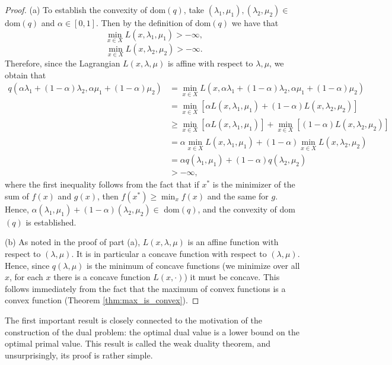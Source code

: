 \documentclass[10pt,a4paper]{article}
\begin{document}
\begin{proof}
	
(a) To establish the convexity of dom$(q)$, take $(\lambda_1, \mu_1), (\lambda_2, \mu_2) \in$ dom$(q)$ and $\alpha \in
[0, 1]$. Then by the definition of dom$(q)$ we have that
\begin{equation*}
	\min_{x \in X} L(x, \lambda_1, \mu_1) > -\infty,
\end{equation*}
\begin{equation*}
	\min_{x \in X} L(x, \lambda_2, \mu_2) > -\infty.
\end{equation*}
Therefore, since the Lagrangian $L(x, \lambda, \mu)$ is affine with respect to $\lambda, \mu$, we obtain that
\begin{align*}
	q(\alpha \lambda_1 + (1-\alpha) \lambda_2, \alpha \mu_1 + (1-\alpha) \mu_2) &= \min_{x \in X} L(x, \alpha \lambda_1 + (1-\alpha) \lambda_2, \alpha \mu_1 + (1-\alpha) \mu_2) \\
	&= \min_{x \in X} \left[ \alpha L(x, \lambda_1, \mu_1) + (1-\alpha) L(x, \lambda_2, \mu_2) \right] \\
	&\geq \min_{x \in X} \left[ \alpha L(x, \lambda_1, \mu_1)\right] +  \min_{x \in X}   \left[(1-\alpha) L(x, \lambda_2, \mu_2) \right]\\
	&= \alpha \min_{x \in X} L(x, \lambda_1, \mu_1) + (1-\alpha) \min_{x \in X} L(x, \lambda_2, \mu_2) \\
	&= \alpha q(\lambda_1, \mu_1) + (1-\alpha) q(\lambda_2, \mu_2) \\
	&> -\infty,
\end{align*}
where the first inequality follows from the fact that if $x^*$ is the minimizer of the sum of $f(x)$ and $g(x)$, then $f(x^*)\geq \min_x f(x)$ and the same for $g$.  
Hence, $\alpha(\lambda_1, \mu_1) + (1-\alpha)(\lambda_2, \mu_2) \in$ dom$(q)$, and the convexity of dom$(q)$ is established.

(b) As noted in the proof of part (a), $L(x, \lambda, \mu)$ is an affine function with respect to
$(\lambda, \mu)$. It is in particular a concave function with respect to $(\lambda, \mu)$. Hence, since $q(\lambda, \mu)$ is
the minimum of concave functions (we minimize over all $x$, for each $x$ there is a concave function $L(x,\cdot)$) it must be concave. This follows immediately from
the fact that the maximum of convex functions is a convex function (Theorem \ref{thm:max_is_convex}). 
\end{proof} 

\noindent The first important result is closely connected to the motivation of the construction of the dual problem: the optimal dual value is a lower bound on the optimal primal
value. This result is called the weak duality theorem, and unsurprisingly, its proof is rather
simple.
\end{document}
